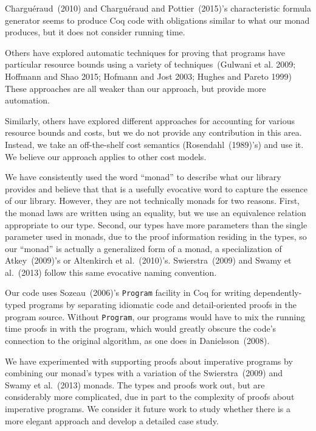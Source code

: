 \documentclass{llncs}
\newcommand{\Scribtexttt}[1]{{\texttt{#1}}}
\begin{document}
Chargu\'{e}raud~(2010)
and Chargu\'{e}raud and Pottier~(2015){'}s characteristic formula
generator seems to produce Coq code with obligations similar to what
our monad produces, but it does not consider running time.

Others have explored automatic techniques for proving that programs
have particular resource bounds using a variety of
techniques~(Gulwani et al. 2009; Hoffmann and Shao 2015; Hofmann and Jost 2003; Hughes and Pareto 1999) These approaches are all weaker than our
approach, but provide more automation.

Similarly, others have explored different approaches for accounting for
various resource bounds and costs, but we do not provide any
contribution in this area. Instead, we take an off{-}the{-}shelf cost
semantics (Rosendahl~(1989){'}s) and use it. We
believe our approach applies to other cost models.

We have consistently used the word {``}monad{''} to describe what our
library provides and believe that that is a usefully evocative word to
capture the essence of our library. However, they are not technically
monads for two reasons. First, the monad laws are written using an
equality, but we use an equivalence relation appropriate to our
type. Second, our types have more parameters than the single parameter
used in monads, due to the proof information residing in the types, so
our {``}monad{''} is actually a generalized form of a monad, a
specialization of Atkey~(2009){'}s or
Altenkirch et al.~(2010){'}s. Swierstra~(2009) and
Swamy et al.~(2013) follow this same evocative naming convention.

Our code uses Sozeau~(2006){'}s \Scribtexttt{Program} facility in Coq for
writing dependently{-}typed programs by separating idiomatic code and
detail{-}oriented proofs in the program source. Without \Scribtexttt{Program},
our programs would have to mix the running time proofs in with the
program, which would greatly obscure the code{'}s connection to the
original algorithm, as one does in
Danielsson~(2008).

We have experimented with supporting proofs about imperative programs
by combining our monad{'}s types with a variation of the
Swierstra~(2009) and Swamy et al.~(2013) monads. The
types and proofs work out, but are considerably more complicated, due
in part to the complexity of proofs about imperative programs. We
consider it future work to study whether there is a more
elegant approach and develop a detailed case study.
\end{document}

